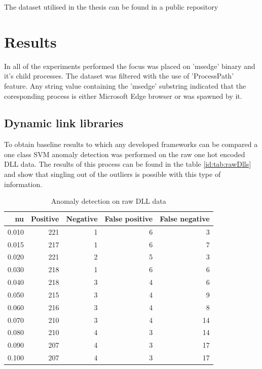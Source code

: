 \documentclass[a4paper,twoside,12pt]{book}
\begin{document}
The dataset utilised in the thesis can be found in a public repository %


\section{Results}

In all of the experiments performed the focus was placed on 'msedge' binary and it's child processes.
The dataset was filtered with the use of 'ProcessPath' feature. Any string value containing the 'msedge'
substring indicated that the coresponding process is either Microsoft Edge browser or was spawned by it. 

\subsection{Dynamic link libraries}
To obtain baseline results to which any developed frameworks can be compared a one class SVM anomaly 
detection was performed on the raw one hot encoded DLL data. The results of this process can be found
in the table \ref{id:tab:rawDlls} and show that singling out of the outliers is possible with this type 
of information.

\begin{table}
	\centering
	\caption{Anomaly detection on raw DLL data}
	\label{id:tab:rawDLLs}
\begin{tabular}{rrrrr}
	\toprule
		nu &  Positive &  Negative &  False positive &  False negative \\
	\midrule
	 0.010 &       221 &         1 &               6 &               3 \\
	 0.015 &       217 &         1 &               6 &               7 \\
	 0.020 &       221 &         2 &               5 &               3 \\
	 0.030 &       218 &         1 &               6 &               6 \\
	 0.040 &       218 &         3 &               4 &               6 \\
	 0.050 &       215 &         3 &               4 &               9 \\
	 0.060 &       216 &         3 &               4 &               8 \\
	 0.070 &       210 &         3 &               4 &              14 \\
	 0.080 &       210 &         4 &               3 &              14 \\
	 0.090 &       207 &         4 &               3 &              17 \\
	 0.100 &       207 &         4 &               3 &              17 \\
	\bottomrule
	\end{tabular}
\end{table}
	
\end{document}
